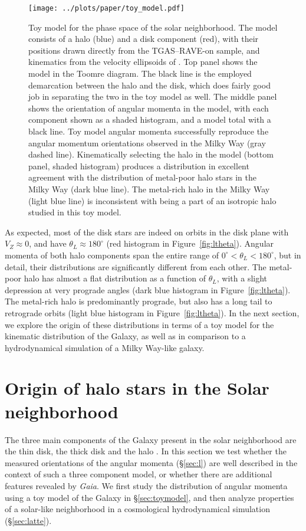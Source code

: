 \documentclass[apj, twocolappendix, numberedappendix, appendixfloats]{emulateapj}
\begin{document}
\begin{figure}
\begin{center}
\texttt{[image: ../plots/paper/toy\_model.pdf]}
\caption{Toy model for the phase space of the solar neighborhood.
The model consists of a halo (blue) and a disk component (red), with their positions drawn directly from the TGAS--RAVE-on sample, and kinematics from the velocity ellipsoids of \citet{bensby2003}.
Top panel shows the model in the Toomre diagram.
The black line is the employed demarcation between the halo and the disk, which does fairly good job in separating the two in the toy model as well.
The middle panel shows the orientation of angular momenta in the model, with each component shown as a shaded histogram, and a model total with a black line.
Toy model angular momenta successfully reproduce the angular momentum orientations observed in the Milky Way (gray dashed line).
Kinematically selecting the halo in the model (bottom panel, shaded histogram) produces a distribution in excellent agreement with the distribution of metal-poor halo stars in the Milky Way (dark blue line).
The metal-rich halo in the Milky Way (light blue line) is inconsistent with being a part of an isotropic halo studied in this toy model.}
\label{fig:toy}
\end{center}
\end{figure}

As expected, most of the disk stars are indeed on orbits in the disk plane with $V_Z\approx0$, and have $\theta_L\approx180^\circ$ (red histogram in Figure~\ref{fig:ltheta}).
Angular momenta of both halo components span the entire range of $0^\circ<\theta_L<180^\circ$, but in detail, their distributions are significantly different from each other.
The metal-poor halo has almost a flat distribution as a function of $\theta_L$, with a slight depression at very prograde angles (dark blue histogram in Figure~\ref{fig:ltheta}).
The metal-rich halo is predominantly prograde, but also has a long tail to retrograde orbits (light blue histogram in Figure~\ref{fig:ltheta}).
In the next section, we explore the origin of these distributions in terms of a toy model for the kinematic distribution of the Galaxy, as well as in comparison to a hydrodynamical simulation of a Milky Way-like galaxy.

\section{Origin of halo stars in the Solar neighborhood}
\label{sec:origin}
The three main components of the Galaxy present in the solar neighborhood are the thin disk, the thick disk and the halo \citep[e.g.,][]{bhg2016}.
In this section we test whether the measured orientations of the angular momenta (\S\ref{sec:l}) are well described in the context of such a three component model, or whether there are additional features revealed by \emph{Gaia}.
We first study the distribution of angular momenta using a toy model of the Galaxy in \S\ref{sec:toymodel}, and then analyze properties of a solar-like neighborhood in a cosmological hydrodynamical simulation (\S\ref{sec:latte}).
\end{document}
